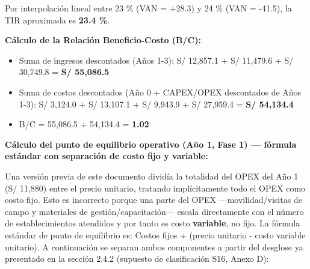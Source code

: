 \documentclass[11pt,a4paper]{article}
\providecommand{\tightlist}{%
  \setlength{\itemsep}{0pt}\setlength{\parskip}{0pt}}
\begin{document}
Por interpolación lineal entre 23 \% (VAN = +28.3) y 24 \% (VAN = -41.5), la TIR aproximada es \textbf{23.4 \%}.

\textbf{Cálculo de la Relación Beneficio-Costo (B/C):}

\begin{itemize}
\tightlist
\item
  Suma de ingresos descontados (Años 1-3): S/ 12,857.1 + S/ 11,479.6 + S/ 30,749.8 = \textbf{S/ 55,086.5}
\item
  Suma de costos descontados (Año 0 + CAPEX/OPEX descontados de Años 1-3): S/ 3,124.0 + S/ 13,107.1 + S/ 9,943.9 + S/ 27,959.4 = \textbf{S/ 54,134.4}
\item
  B/C = 55,086.5 ÷ 54,134.4 = \textbf{1.02}
\end{itemize}

\textbf{Cálculo del punto de equilibrio operativo (Año 1, Fase 1) --- fórmula estándar con separación de costo fijo y variable:}

Una versión previa de este documento dividía la totalidad del OPEX del Año 1 (S/ 11,880) entre el precio unitario, tratando implícitamente todo el OPEX como costo fijo. Esto es incorrecto porque una parte del OPEX ---movilidad/visitas de campo y materiales de gestión/capacitación--- escala directamente con el número de establecimientos atendidos y por tanto es costo \textbf{variable}, no fijo. La fórmula estándar de punto de equilibrio es: Costos fijos ÷ (precio unitario - costo variable unitario). A continuación se separan ambos componentes a partir del desglose ya presentado en la sección 2.4.2 (supuesto de clasificación S16, Anexo D):
\end{document}
